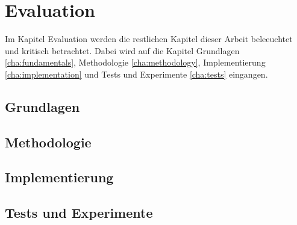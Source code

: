\chapter{Evaluation}

Im Kapitel Evaluation werden die restlichen Kapitel dieser Arbeit beleeuchtet und kritisch betrachtet. Dabei wird auf die Kapitel Grundlagen \ref{cha:fundamentals}, Methodologie \ref{cha:methodology}, Implementierung \ref{cha:implementation} und Tests und Experimente \ref{cha:tests} eingangen.

\section{Grundlagen}

\section{Methodologie}

\section{Implementierung}

\section{Tests und Experimente}